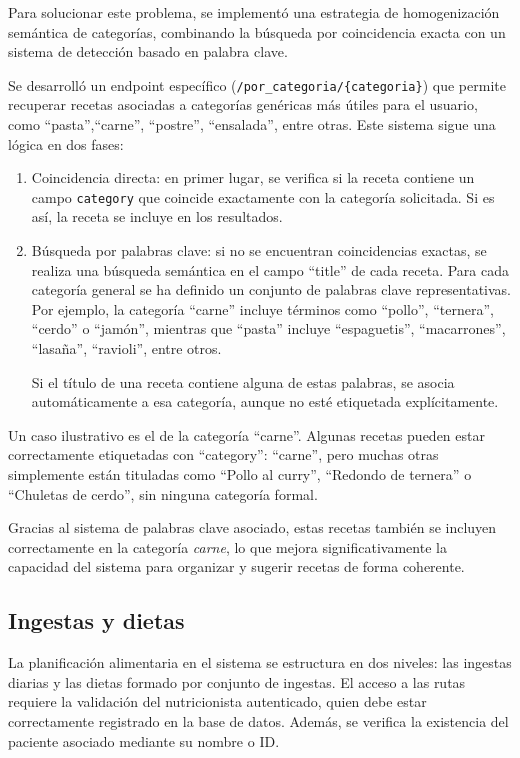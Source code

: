 Para solucionar este problema, se implementó una estrategia de homogenización semántica de categorías, combinando la búsqueda por coincidencia exacta con un sistema de detección basado en palabra clave.

Se desarrolló un endpoint específico (\texttt{/por\_categoria/\{categoria\}}) que permite recuperar recetas asociadas a categorías genéricas más útiles para el usuario, como ``pasta'',``carne'', ``postre'', ``ensalada'', entre otras. Este sistema sigue una lógica en dos fases:
\begin{enumerate}
  \item Coincidencia directa: en primer lugar, se verifica si la receta contiene un campo \texttt{category} que coincide exactamente con la categoría solicitada. Si es así, la receta se incluye en los resultados.

  \item Búsqueda por palabras clave: si no se encuentran coincidencias exactas, se realiza una búsqueda semántica en el campo ``title'' de cada receta. Para cada categoría general se ha definido un conjunto de palabras clave representativas. Por ejemplo, la categoría ``carne'' incluye términos como ``pollo'', ``ternera'', ``cerdo'' o ``jamón'', mientras que ``pasta'' incluye ``espaguetis'', ``macarrones'', ``lasaña'', ``ravioli'', entre otros.

  Si el título de una receta contiene alguna de estas palabras, se asocia automáticamente a esa categoría, aunque no esté etiquetada explícitamente.
\end{enumerate}

Un caso ilustrativo es el de la categoría ``carne''. Algunas recetas pueden estar correctamente etiquetadas con ``category'': ``carne'', pero muchas otras simplemente están tituladas como ``Pollo al curry'', ``Redondo de ternera'' o ``Chuletas de cerdo'', sin ninguna categoría formal.

Gracias al sistema de palabras clave asociado, estas recetas también se incluyen correctamente en la categoría \textit{carne}, lo que mejora significativamente la capacidad del sistema para organizar y sugerir recetas de forma coherente.

\subsection{Ingestas y dietas}
La planificación alimentaria en el sistema se estructura en dos niveles: las ingestas diarias y las dietas formado por conjunto de ingestas. El acceso a las rutas requiere la validación del nutricionista autenticado, quien debe estar correctamente registrado en la base de datos. Además, se verifica la existencia del paciente asociado mediante su nombre o ID.

